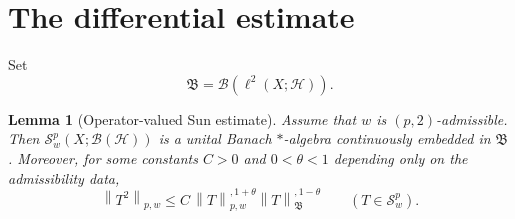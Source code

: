 \documentclass[11pt]{article}
\newtheorem{lemma}{Lemma}
\newcommand{\BH}{\mathcal B(\mathcal H)}
\newcommand{\BB}{\mathfrak B}
\newcommand{\Spw}{\mathcal S^p_w}
\newcommand{\norm}[1]{\left\lVert #1\right\rVert}
\newcommand{\snorm}[2]{\left\lVert #1\right\rVert_{#2}}
\begin{document}
\section*{The differential estimate}

Set
\[
        \BB=\mathcal B(\ell^2(X;\mathcal H)).
\]

\begin{lemma}[Operator-valued Sun estimate]\label{lem:differential}
Assume that $w$ is $(p,2)$-admissible.  Then $\Spw(X;\BH)$ is a unital
Banach $*$-algebra continuously embedded in $\BB$.  Moreover, for some
constants $C>0$ and $0<\theta<1$ depending only on the admissibility data,
\begin{equation}
 \snorm{T^2}{p,w}
 \le C\,\snorm{T}{p,w}^{,1+\theta}
          \norm{T}_{\BB}^{,1-\theta}
 \qquad(T\in\Spw).
                                                        \label{eq:differential}
\end{equation}
\end{lemma}
\end{document}
